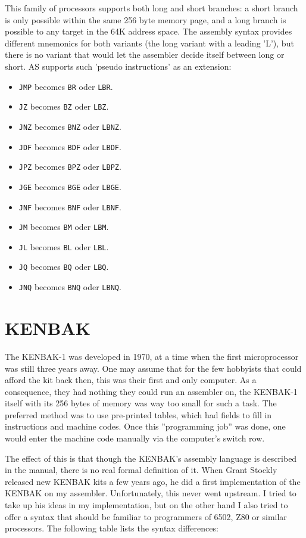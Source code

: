 \documentclass[12pt,twoside]{report}
\newcommand{\tty}[1]{{\tt #1}}
\begin{document}
This family of processors supports both long and short branches: a short
branch is only possible within the same 256 byte memory page, and a long branch
is possible to any target in the 64K address space.  The assembly syntax provides
different mnemonics for both variants (the long variant with a leading 'L'), but
there is no variant that would let the assembler decide itself between long
or short.  AS supports such 'pseudo instructions' as an extension:
\begin{itemize}
\item{\tty{JMP} becomes \tty{BR} oder \tty{LBR}.}
\item{\tty{JZ} becomes \tty{BZ} oder \tty{LBZ}.}
\item{\tty{JNZ} becomes \tty{BNZ} oder \tty{LBNZ}.}
\item{\tty{JDF} becomes \tty{BDF} oder \tty{LBDF}.}
\item{\tty{JPZ} becomes \tty{BPZ} oder \tty{LBPZ}.}
\item{\tty{JGE} becomes \tty{BGE} oder \tty{LBGE}.}
\item{\tty{JNF} becomes \tty{BNF} oder \tty{LBNF}.}
\item{\tty{JM} becomes \tty{BM} oder \tty{LBM}.}
\item{\tty{JL} becomes \tty{BL} oder \tty{LBL}.}
\item{\tty{JQ} becomes \tty{BQ} oder \tty{LBQ}.}
\item{\tty{JNQ} becomes \tty{BNQ} oder \tty{LBNQ}.}
\end{itemize}



\section{KENBAK}

The KENBAK-1 was developed in 1970, at a time when the first microprocessor
was still three years away.  One may assume that for the few hobbyists that
could afford the kit back then, this was their first and only computer.  As
a consequence, they had nothing they could run an assembler on, the KENBAK-1 
itself with its 256 bytes of memory was way too small for such a task.  The
preferred method was to use pre-printed tables, which had fields to fill in
instructions and machine codes.  Once this ''programming job'' was done, one
would enter the machine code manually via the computer's switch row.

The effect of this is that though the KENBAK's assembly language is described
in the manual, there is no real formal definition of it.  When Grant Stockly
released new KENBAK kits a few years ago, he did a first implementation of the
KENBAK on my assembler.  Unfortunately, this never went upstream.  I tried
to take up his ideas in my implementation, but on the other hand I also tried to
offer a syntax that should be familiar to programmers of 6502, Z80 or similar
processors.  The following table lists the syntax differences:
\end{document}
